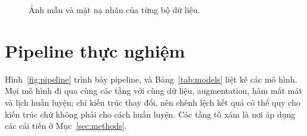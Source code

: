\documentclass[10pt,twoside]{article}
\begin{document}
\begin{figure}[t]
\centering
{}
\caption{Ảnh mẫu và mặt nạ nhãn của từng bộ dữ liệu.}\label{fig:samples}
\end{figure}

\section{Pipeline thực nghiệm}\label{sec:pipeline}
Hình~\ref{fig:pipeline} trình bày pipeline, và Bảng~\ref{tab:models} liệt kê các mô
hình. Mọi mô hình đi qua cùng các tầng với cùng dữ liệu, augmentation, hàm mất mát và
lịch huấn luyện; chỉ kiến trúc thay đổi, nên chênh lệch kết quả có thể quy cho kiến
trúc chứ không phải cho cách huấn luyện. Các tầng tô xám là nơi áp dụng các cải tiến
ở Mục~\ref{sec:methods}.
\end{document}
